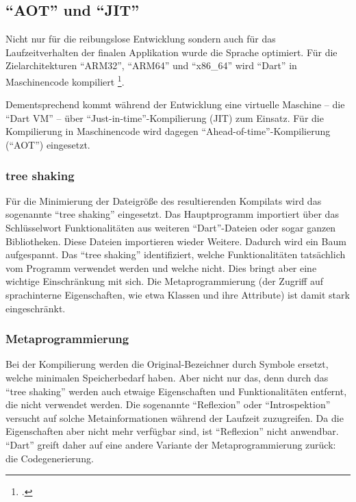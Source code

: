 \subsection{\enquote{AOT} und \enquote{JIT}}
Nicht nur für die reibungslose Entwicklung sondern auch für das Laufzeitverhalten der finalen Applikation wurde die Sprache optimiert.
Für die Zielarchitekturen \enquote{ARM32}, \enquote{ARM64} und \enquote{x86_64} wird \enquote{Dart} in Maschinencode kompiliert \footcite[Vgl.][]{DartThePlatforms}.

Dementsprechend kommt während der Entwicklung eine virtuelle Maschine -- die \enquote{Dart VM} -- über \enquote{Just-in-time}-Kompilierung (JIT) zum Einsatz.
Für die Kompilierung in Maschinencode wird dagegen \enquote{Ahead-of-time}-Kompilierung (\enquote{AOT}) eingesetzt.

\subsubsection{tree shaking}
Für die Minimierung der Dateigröße des resultierenden Kompilats wird das sogenannte \enquote{tree shaking} eingesetzt.
Das Hauptprogramm importiert über das Schlüsselwort  Funktionalitäten aus  weiteren \enquote{Dart}-Dateien oder sogar ganzen Bibliotheken.
Diese Dateien importieren wieder Weitere.
Dadurch wird ein Baum aufgespannt.
Das \enquote{tree shaking} identifiziert, welche Funktionalitäten tatsächlich vom Programm verwendet werden und welche nicht.
Dies bringt aber eine wichtige Einschränkung mit sich.
Die Metaprogrammierung (der Zugriff auf sprachinterne Eigenschaften, wie etwa Klassen und ihre Attribute) ist damit stark eingeschränkt.

\subsubsection{Metaprogrammierung}
Bei der Kompilierung werden die Original-Bezeichner durch Symbole ersetzt, welche minimalen Speicherbedarf haben.
Aber nicht nur das, denn durch das \enquote{tree shaking} werden auch etwaige Eigenschaften und Funktionalitäten entfernt, die nicht verwendet werden.
Die sogenannte \enquote{Reflexion} oder \enquote{Introspektion} versucht auf solche Metainformationen während der Laufzeit zuzugreifen.
Da die Eigenschaften aber nicht mehr verfügbar sind, ist \enquote{Reflexion} nicht anwendbar.
\enquote{Dart} greift daher auf eine andere Variante der Metaprogrammierung zurück: die Codegenerierung.

